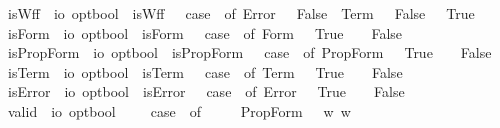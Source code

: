 \begin{isabellebody}
\isamarkuptrue%
\isamarkupfalse%
\ isWff\ {\isacharcolon}{\isacharcolon}\ {\isachardoublequoteopen}io\ opt{\isasymRightarrow}bool{\isachardoublequoteclose}\ \ {\isachardoublequoteopen}isWff\ {\isasymphi}\ {\isasymequiv}\ case\ {\isasymphi}\ of\ Error\ {\isasympsi}\ {\isasymRightarrow}\ False\ {\isacharbar}\ Term\ {\isasympsi}\ {\isasymRightarrow}\ False\ {\isacharbar}{\isacharunderscore}\ {\isasymRightarrow}\ True{\isachardoublequoteclose}\isanewline
{}\isamarkupfalse%
\ isForm\ {\isacharcolon}{\isacharcolon}\ {\isachardoublequoteopen}io\ opt{\isasymRightarrow}bool{\isachardoublequoteclose}\ \ {\isachardoublequoteopen}isForm\ {\isasymphi}\ {\isasymequiv}\ case\ {\isasymphi}\ of\ Form\ {\isasympsi}\ {\isasymRightarrow}\ True\ {\isacharbar}\ {\isacharunderscore}\ {\isasymRightarrow}\ False{\isachardoublequoteclose}\isanewline
{}\isamarkupfalse%
\ isPropForm\ {\isacharcolon}{\isacharcolon}\ {\isachardoublequoteopen}io\ opt{\isasymRightarrow}bool{\isachardoublequoteclose}\ \ {\isachardoublequoteopen}isPropForm\ {\isasymphi}\ {\isasymequiv}\ case\ {\isasymphi}\ of\ PropForm\ {\isasympsi}\ {\isasymRightarrow}\ True\ {\isacharbar}\ {\isacharunderscore}\ {\isasymRightarrow}\ False{\isachardoublequoteclose}\isanewline
{}\isamarkupfalse%
\ isTerm\ {\isacharcolon}{\isacharcolon}\ {\isachardoublequoteopen}io\ opt{\isasymRightarrow}bool{\isachardoublequoteclose}\ \ {\isachardoublequoteopen}isTerm\ {\isasymphi}\ {\isasymequiv}\ case\ {\isasymphi}\ of\ Term\ {\isasympsi}\ {\isasymRightarrow}\ True\ {\isacharbar}\ {\isacharunderscore}\ {\isasymRightarrow}\ False{\isachardoublequoteclose}\isanewline
{}\isamarkupfalse%
\ isError\ {\isacharcolon}{\isacharcolon}\ {\isachardoublequoteopen}io\ opt{\isasymRightarrow}bool{\isachardoublequoteclose}\ \ {\isachardoublequoteopen}isError\ {\isasymphi}\ {\isasymequiv}\ case\ {\isasymphi}\ of\ Error\ {\isasympsi}\ {\isasymRightarrow}\ True\ {\isacharbar}\ {\isacharunderscore}\ {\isasymRightarrow}\ False{\isachardoublequoteclose}\isanewline
{}\isamarkupfalse%
\ valid\ {\isacharcolon}{\isacharcolon}\ {\isachardoublequoteopen}io\ opt{\isasymRightarrow}bool{\isachardoublequoteclose}\ \ \ {\isachardoublequoteopen}{\isacharbrackleft}{\isasymphi}{\isacharbrackright}\ {\isasymequiv}\ case\ {\isasymphi}\ of\ \isanewline
\ \ \ \ PropForm\ {\isasympsi}\ {\isasymRightarrow}\ {\isasymforall}w{\isachardot}{\isacharparenleft}{\isasympsi}\ w{\isacharparenright}\isanewline

\end{isabellebody}
